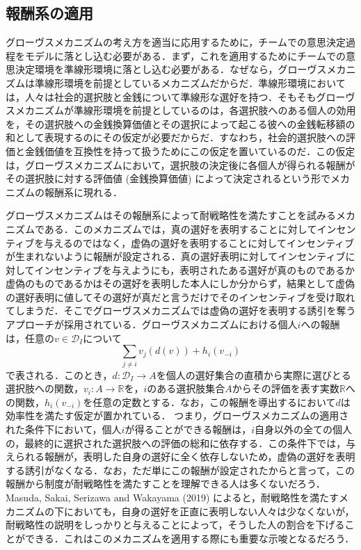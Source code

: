 \documentclass[a4paper, 11pt]{jsarticle}
\begin{document}
\subsection{報酬系の適用}
グローヴスメカニズムの考え方を適当に応用するために，チームでの意思決定過程をモデルに落とし込む必要がある．まず，これを適用するためにチームでの意思決定環境を準線形環境に落とし込む必要がある．なぜなら，グローヴスメカニズムは準線形環境を前提としているメカニズムだからだ．準線形環境においては，人々は社会的選択肢と金銭について準線形な選好を持つ．そもそもグローヴスメカニズムが準線形環境を前提としているのは，各選択肢へのある個人の効用を，その選択肢への金銭換算価値とその選択によって起こる彼への金銭転移額の和として表現するのにその仮定が必要だからだ．すなわち，社会的選択肢への評価と金銭価値を互換性を持って扱うためにこの仮定を置いているのだ．この仮定は，グローヴスメカニズムにおいて，選択肢の決定後に各個人が得られる報酬がその選択肢に対する評価値 (金銭換算価値) によって決定されるという形でメカニズムの報酬系に現れる．

グローヴスメカニズムはその報酬系によって耐戦略性を満たすことを試みるメカニズムである．このメカニズムでは，真の選好を表明することに対してインセンティブを与えるのではなく，虚偽の選好を表明することに対してインセンティブが生まれないように報酬が設定される．真の選好表明に対してインセンティブに対してインセンティブを与えようにも，表明されたある選好が真のものであるか虚偽のものであるかはその選好を表明した本人にしか分からず，結果として虚偽の選好表明に値してその選好が真だと言うだけでそのインセンティブを受け取れてしまうだ．そこでグローヴスメカニズムでは虚偽の選好を表明する誘引を奪うアプローチが採用されている．グローヴスメカニズムにおける個人\(i\)への報酬は，任意の\(v \in \mathscr{D}_I\)について
\[\sum_{j \neq i}v_j(d(v)) + h_i(v_{-i})\]
で表される．このとき，\(d: \mathscr{D}_I \rightarrow A\)を個人の選好集合の直積から実際に選びとる選択肢への関数，\(v_i : A \rightarrow \mathbb{R}\)を，\(i\)のある選択肢集合\(A\)からその評価を表す実数\(\mathbb{R}\)への関数，\(h_i(v_{-i})\)を任意の定数とする．なお，この報酬を導出するにおいて\(d\)は効率性を満たす仮定が置かれている．
つまり，グローヴスメカニズムの適用された条件下において，個人\(i\)が得ることができる報酬は，\(i\)自身以外の全ての個人の，最終的に選択された選択肢への評価の総和に依存する．この条件下では，与えられる報酬が，表明した自身の選好に全く依存しないため，虚偽の選好を表明する誘引がなくなる．なお，ただ単にこの報酬が設定されたからと言って，この報酬から制度が耐戦略性を満たすことを理解できる人は多くないだろう．Masuda, Sakai, Serizawa and Wakayama (2019) \cite{Sakai2019}によると，耐戦略性を満たすメカニズムの下においても，自身の選好を正直に表明しない人々は少なくないが，耐戦略性の説明をしっかりと与えることによって，そうした人の割合を下げることができる．これはこのメカニズムを適用する際にも重要な示唆となるだろう．
\end{document}
